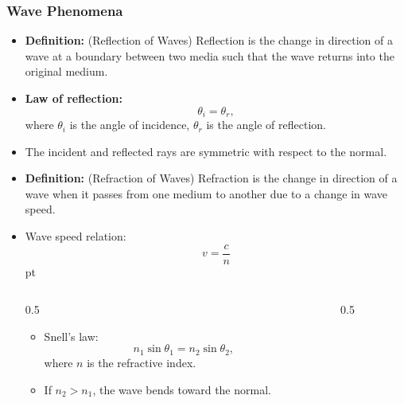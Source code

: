 \documentclass[t,aspectratio=169]{beamer}
\begin{document}
\begin{frame}
\frametitle{Wave Phenomena}
\begin{itemize}
\item \textbf{Definition:} (Reflection of Waves) Reflection is the change in direction of a wave at a boundary between two media such that the wave returns into the original medium.
\item \textbf{Law of reflection:}
$$ \theta_i = \theta_r,$$
where $\theta_i$ is the angle of incidence, $\theta_r$ is the angle of reflection. 
\item The incident and reflected rays are symmetric with respect to the normal.

\begin{center}
\end{center}

\pagebreak
\item \textbf{Definition:} (Refraction of Waves) Refraction is the change in direction of a wave when it passes from one medium to another due to a change in wave speed.
\item Wave speed relation:
  $$ v = \frac{c}{n} $$
   pt
  \begin{columns}
    \begin{column}{0.5\linewidth}
    \begin{itemize}  
\item Snell's law:
$$ n_1 \sin \theta_1 = n_2 \sin \theta_2, $$
where $n$ is the refractive index.
\item If $n_2 > n_1$, the wave bends toward the normal.
\end{itemize}
\end{column}
\begin{column}{0.5\linewidth}
\begin{center}
\end{center}
\end{column}
\end{columns}
\end{itemize}
\end{frame}
\end{document}
